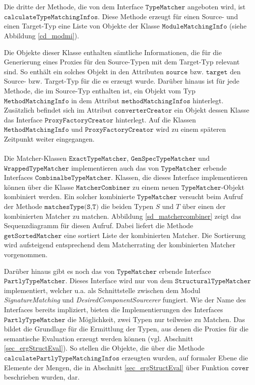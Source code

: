 \\\\
Die dritte der Methode, die von dem Interface $\texttt{TypeMatcher}$ angeboten wird, ist $\texttt{calculateTypeMatchingInfos}$. Diese Methode erzeugt für einen Source- und einen Target-Typ eine Liste von Objekte der Klasse $\texttt{ModuleMatchingInfo}$ (siehe Abbildung \ref{cd_modmi}).
\begin{figure}
\end{figure}\label{cd_modmi}
\noindent
Die Objekte dieser Klasse enthalten sämtliche Informationen, die für die Generierung eines Proxies für den Source-Typen mit dem Target-Typ relevant sind. So enthält ein solches Objekt in den Attributen $\texttt{source}$ bzw. $\texttt{target}$ den Source- bzw. Target-Typ für die es erzeugt wurde. Darüber hinaus ist für jede Methode, die im Source-Typ enthalten ist, ein Objekt vom Typ $\texttt{MethodMatchingInfo}$ in dem Attribut $\texttt{methodMatchingInfos}$ hinterlegt. Zusätzlich befindet sich im Attribut $\texttt{converterCreator}$ ein Objekt dessen Klasse das Interface $\texttt{ProxyFactoryCreator}$ hinterlegt. Auf die Klassen $\texttt{MethodMatchingInfo}$ und $\texttt{ProxyFactoryCreator}$ wird zu einem späteren Zeitpunkt weiter eingegangen.
\\\\
Die Matcher-Klassen $\texttt{ExactTypeMatcher}$, $\texttt{GenSpecTypeMatcher}$ und $\texttt{WrappedTypeMatcher}$ implementieren auch das von $\texttt{TypeMatcher}$ erbende Interfaces $\texttt{CombinalbeTypeMatcher}$. Klassen, die dieses Interface implementieren können über die Klasse $\texttt{MatcherCombiner}$ zu einem neuen $\texttt{TypeMatcher}$-Objekt kombiniert werden. Ein solcher kombinierte $\texttt{TypeMatcher}$ versucht beim Aufruf der Methode $\texttt{matchesType(S,T)}$ die beiden Typen $S$ und $T$ über einen der kombinierten Matcher zu matchen. Abbildung \ref{sd_matchercombiner} zeigt das Sequenzdiagramm für diesen Aufruf. Dabei liefert die Methode $\texttt{getSortedMatcher}$ eine sortiert Liste der kombinierten Matcher. Die Sortierung wird aufsteigend entsprechend dem Matcherrating der kombinierten Matcher vorgenommen.
\begin{figure}
\end{figure}\label{sd_matchercombiner}
\noindent
Darüber hinaus gibt es noch das von $\texttt{TypeMatcher}$ erbende Interface $\texttt{PartlyTypeMatcher}$. Dieses Interface wird nur von dem $\texttt{StructuralTypeMatcher}$ implementiert, welcher u.a. als Schnittstelle zwischen dem Modul \emph{SignatureMatching} und \emph{DesiredComponentSourcerer} fungiert. Wie der Name des Interfaces bereits impliziert, bieten die Implementierungen des Interfaces $\texttt{PartlyTypeMatcher}$ die Möglichkeit, zwei Typen nur teilweise zu Matchen. Das bildet die Grundlage für die Ermittlung der Typen, aus denen die Proxies für die semantische Evaluation erzeugt werden können (vgl. Abschnitt \ref{sec_ergStructEval}). So stellen die Objekte, die über die Methode $\texttt{calculatePartlyTypeMatchingInfos}$ erzeugten wurden, auf formaler Ebene die Elemente der Mengen, die in Abschnitt \ref{sec_ergStructEval} über Funktion $\texttt{cover}$ beschrieben wurden, dar.
